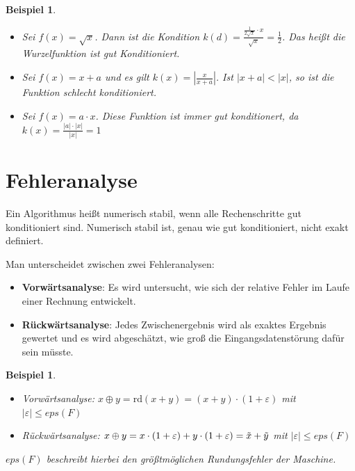 \documentclass[12pt]{article}
\newtheorem{beispiel}[satz]{Beispiel}
\begin{document}
\newpage

\begin{beispiel}
    \begin{itemize}
        \item Sei $f(x)= \sqrt{x}$. Dann ist die Kondition $k(d)= \frac{\frac{1}{2 \sqrt{x}} \cdot x}{\sqrt{x}}= \frac{1}{2}$. Das heißt die Wurzelfunktion ist gut Konditioniert. 
        \item Sei $f(x)= x+a$ und es gilt $k(x)= |\frac{x}{x+a}|$. Ist $|x+a|<|x|$, so ist die Funktion schlecht konditioniert. 
        \item Sei $f(x)= a \cdot x$. Diese Funktion ist immer gut konditionert, da $k(x)= \frac{|a| \cdot |x|}{|x|}=1$
    \end{itemize}
    \label{kondition}
\end{beispiel}

\newpage
\section{Fehleranalyse}
Ein Algorithmus heißt numerisch stabil, wenn alle Rechenschritte gut konditioniert sind. Numerisch stabil ist, genau wie gut konditioniert, nicht exakt definiert. 

\noindent Man unterscheidet zwischen zwei Fehleranalysen: 
\begin{itemize}
    \item \textbf{Vorwärtsanalyse}: Es wird untersucht, wie sich der relative Fehler im Laufe einer Rechnung entwickelt.
    \item \textbf{Rückwärtsanalyse}: Jedes Zwischenergebnis wird als exaktes Ergebnis gewertet und es wird abgeschätzt, wie groß die Eingangsdatenstörung dafür sein müsste. 
\end{itemize}

\begin{beispiel}
    \begin{itemize}
        \item Vorwärtsanalyse: $x \oplus y = \mathrm{rd}(x+y)= (x+y) \cdot(1+ \varepsilon)$ mit $|\varepsilon| \leq eps(F)$
        \item Rückwärtsanalyse: $x\oplus y= x \cdot (1+ \varepsilon)+y\cdot (1+\varepsilon)=\Tilde{x}+ \Tilde{y}$ mit $|\varepsilon|\leq eps(F)$
    \end{itemize} 
     \vspace{\baselineskip}
   \noindent $eps(F)$ beschreibt hierbei den größtmöglichen Rundungsfehler der Maschine. 
\end{beispiel}
\end{document}
